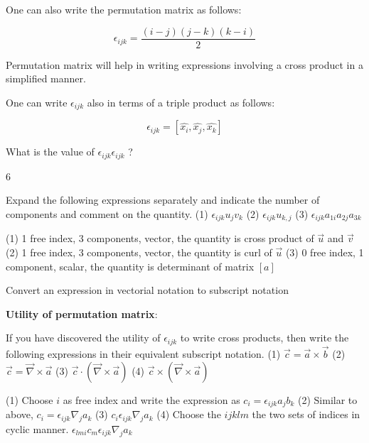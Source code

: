 One can also write the permutation matrix as follows:

$$ \epsilon_{ijk} = \frac{(i-j)(j-k)(k-i)}{2} $$

Permutation matrix will help in writing expressions involving a cross product in a simplified manner.

One can write $\epsilon_{ijk}$ also in terms of a triple product as follows:

$$ \epsilon_{ijk} = \left[ \hat{x_i}, \hat{x_j}, \hat{x_k} \right] $$


\begin{question}
What is the value of $\epsilon_{ijk} \epsilon_{ijk}$ ?
\end{question}
\begin{solution}[print]
6
\end{solution}



\begin{question}
Expand the following expressions separately and indicate the number of components and comment on the quantity.
(1) $\epsilon_{ijk} u_j v_k$ 
(2) $\epsilon_{ijk} u_{k,j}$ 
(3) $\epsilon_{ijk} a_{1i} a_{2j} a_{3k}$
\end{question}
\begin{solution}[print]
(1) 1 free index, 3 components, vector, the quantity is cross product of $\vec{u}$ and $\vec{v}$
(2) 1 free index, 3 components, vector, the quantity is curl of $\vec{u}$
(3) 0 free index, 1 component, scalar, the quantity is determinant of matrix $[a]$
\end{solution}

\begin{lo3}[Preliminaries]
Convert an expression in vectorial notation to subscript notation
\end{lo3}


{\bf Utility of permutation matrix}:

\begin{question}
If you have discovered the utility of $\epsilon_{ijk}$ to write cross products, then write the following expressions in their equivalent subscript notation.
	(1) $\vec{c} = \vec{a} \times \vec{b}$
	(2) $\vec{c} = \vec{\nabla} \times \vec{a}$
	(3) $\vec{c} \cdot \left( \vec{\nabla} \times \vec{a} \right)$
	(4) $\vec{c} \times \left( \vec{\nabla} \times \vec{a} \right)$
\end{question}
\begin{solution}[print]
(1) Choose $i$ as free index and write the expression as $c_i = \epsilon_{ijk} a_j b_k$
(2) Similar to above, $c_i = \epsilon_{ijk} \nabla_j a_k $
(3) $c_i \epsilon_{ijk} \nabla_j a_k $
(4) Choose the $ijklm$ the two sets of indices in cyclic manner. $\epsilon_{lmi} c_m \epsilon_{ijk} \nabla_j a_k $
\end{solution}

